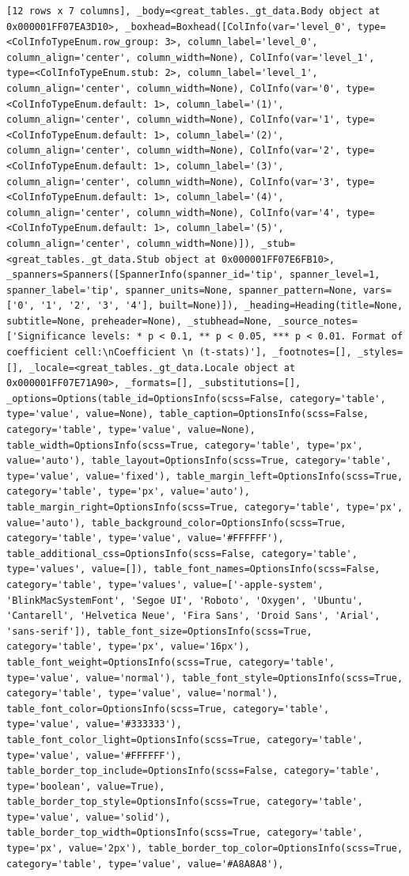 \documentclass[
  letterpaper,
  DIV=11,
  numbers=noendperiod]{scrreprt}
\begin{document}
\begin{verbatim}
[12 rows x 7 columns], _body=<great_tables._gt_data.Body object at 0x000001FF07EA3D10>, _boxhead=Boxhead([ColInfo(var='level_0', type=<ColInfoTypeEnum.row_group: 3>, column_label='level_0', column_align='center', column_width=None), ColInfo(var='level_1', type=<ColInfoTypeEnum.stub: 2>, column_label='level_1', column_align='center', column_width=None), ColInfo(var='0', type=<ColInfoTypeEnum.default: 1>, column_label='(1)', column_align='center', column_width=None), ColInfo(var='1', type=<ColInfoTypeEnum.default: 1>, column_label='(2)', column_align='center', column_width=None), ColInfo(var='2', type=<ColInfoTypeEnum.default: 1>, column_label='(3)', column_align='center', column_width=None), ColInfo(var='3', type=<ColInfoTypeEnum.default: 1>, column_label='(4)', column_align='center', column_width=None), ColInfo(var='4', type=<ColInfoTypeEnum.default: 1>, column_label='(5)', column_align='center', column_width=None)]), _stub=<great_tables._gt_data.Stub object at 0x000001FF07E6FB10>, _spanners=Spanners([SpannerInfo(spanner_id='tip', spanner_level=1, spanner_label='tip', spanner_units=None, spanner_pattern=None, vars=['0', '1', '2', '3', '4'], built=None)]), _heading=Heading(title=None, subtitle=None, preheader=None), _stubhead=None, _source_notes=['Significance levels: * p < 0.1, ** p < 0.05, *** p < 0.01. Format of coefficient cell:\nCoefficient \n (t-stats)'], _footnotes=[], _styles=[], _locale=<great_tables._gt_data.Locale object at 0x000001FF07E71A90>, _formats=[], _substitutions=[], _options=Options(table_id=OptionsInfo(scss=False, category='table', type='value', value=None), table_caption=OptionsInfo(scss=False, category='table', type='value', value=None), table_width=OptionsInfo(scss=True, category='table', type='px', value='auto'), table_layout=OptionsInfo(scss=True, category='table', type='value', value='fixed'), table_margin_left=OptionsInfo(scss=True, category='table', type='px', value='auto'), table_margin_right=OptionsInfo(scss=True, category='table', type='px', value='auto'), table_background_color=OptionsInfo(scss=True, category='table', type='value', value='#FFFFFF'), table_additional_css=OptionsInfo(scss=False, category='table', type='values', value=[]), table_font_names=OptionsInfo(scss=False, category='table', type='values', value=['-apple-system', 'BlinkMacSystemFont', 'Segoe UI', 'Roboto', 'Oxygen', 'Ubuntu', 'Cantarell', 'Helvetica Neue', 'Fira Sans', 'Droid Sans', 'Arial', 'sans-serif']), table_font_size=OptionsInfo(scss=True, category='table', type='px', value='16px'), table_font_weight=OptionsInfo(scss=True, category='table', type='value', value='normal'), table_font_style=OptionsInfo(scss=True, category='table', type='value', value='normal'), table_font_color=OptionsInfo(scss=True, category='table', type='value', value='#333333'), table_font_color_light=OptionsInfo(scss=True, category='table', type='value', value='#FFFFFF'), table_border_top_include=OptionsInfo(scss=False, category='table', type='boolean', value=True), table_border_top_style=OptionsInfo(scss=True, category='table', type='value', value='solid'), table_border_top_width=OptionsInfo(scss=True, category='table', type='px', value='2px'), table_border_top_color=OptionsInfo(scss=True, category='table', type='value', value='#A8A8A8'), 
\end{verbatim}
\end{document}
